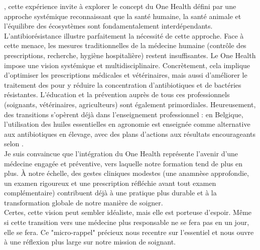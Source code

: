, cette expérience invite à explorer le concept du One Health défini par une approche systémique reconnaissant que la santé humaine, la santé animale et l'équilibre des écosystèmes sont fondamentalement interdépendants. L’antibiorésistance illustre parfaitement la nécessité de cette approche. Face à cette menace, les mesures traditionnelles de la médecine humaine (contrôle des prescriptions, recherche, hygiène hospitalière) restent insuffisantes. Le One Health impose une vision systémique et multidisciplinaire. Concrètement, cela implique d'optimiser les prescriptions médicales et vétérinaires, mais aussi d'améliorer le traitement des  pour y réduire la concentration d’antibiotiques et de bactéries résistantes. L'éducation et la prévention auprès de tous ces professionnels (soignants, vétérinaires, agriculteurs) sont également primordiales. Heureusement, des transitions s'opèrent déjà dans l'enseignement professionnel : en Belgique, l'utilisation des huiles essentielles \parencite{siep_formation_524} en agronomie est enseignée comme alternative aux antibiotiques en élevage, avec des plans d'actions aux résultats encourageants selon \textcite{celagri_antibioresistance}.\\
Je suis convaincue que l’intégration du One Health représente l’avenir d'une médecine engagée et préventive, vers laquelle notre formation tend de plus en plus. À notre échelle, des gestes cliniques modestes (une anamnèse approfondie, un examen rigoureux et une prescription réfléchie avant tout examen complémentaire) contribuent déjà à une pratique plus durable et à la transformation globale de notre manière de soigner.\\


Certes, cette vision peut sembler idéaliste, mais elle est porteuse d’espoir. Même si cette transition vers une médecine plus responsable ne se fera pas en un jour, elle se fera. Ce "micro-rappel" précieux nous recentre sur l’essentiel et nous ouvre à une réflexion plus large sur notre mission de soignant.
